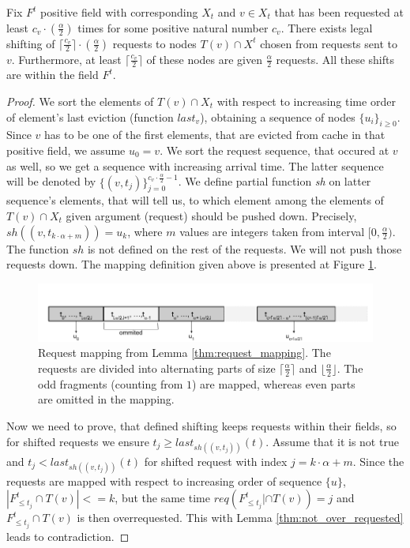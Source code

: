 \begin{lemma}
Fix $F^t$ positive field with corresponding $X_t$ and $v \in X_t$ that has 
been requested at least $c_v \cdot (\frac{\alpha}{2})$ times for some positive 
natural number $c_v$. There exists legal shifting of $\lceil \frac{c_v}{2} 
\rceil \cdot (\frac{\alpha}{2})$ requests to nodes 
$T(v) \cap X^t$ chosen from requests sent to $v$. Furthermore, at least $\lceil 
\frac{c_v}{2} \rceil$ of these nodes are given $\frac{\alpha}{2}$ requests. All 
these shifts are within the field $F^t$.
\label{thm:request_mapping}
\end{lemma}
\begin{proof}
We sort the elements of $T(v) \cap X_t$ with respect to increasing time order 
of element's last eviction (function $last_v$), obtaining a sequence of nodes 
$\{u_i\}_{i \geq 0}$. Since $v$ has to be one of the first elements, that are 
evicted from cache in that positive field, we assume $u_0 = v$. We sort the 
request sequence, that occured at $v$ as well, so we get a sequence with 
increasing arrival time. The latter sequence will be denoted by 
$\{(v, t_j)\}_{j=0}^{c_v \cdot \frac{\alpha}{2} - 1}$. We define partial 
function \textit{sh} on latter sequence's elements, that will tell us, to which 
element among the elements of  $T(v) \cap X_t$ given argument (request) should 
be pushed down. Precisely, $sh((v, t_{k \cdot \alpha + m})) = u_k$, where $m$ 
values are integers taken from interval $[0, \frac{\alpha}{2})$. The function 
$sh$ is not defined on the rest of the requests. We will not push those 
requests down. The mapping definition given above is presented at Figure 
\ref{fig:req_map}.
\begin{figure}
 \begin{center}
  \includegraphics[width=1.1\textwidth]{request_mapping.png}
 \end{center}
 \caption{Request mapping from Lemma \ref{thm:request_mapping}. The requests 
are divided into alternating parts of size $\lceil \frac{\alpha}{2} \rceil$ 
and $\lfloor \frac{\alpha}{2} \rfloor$. The odd fragments (counting from $1$) 
are mapped, whereas even parts are omitted in the mapping.}
 \label{fig:req_map}
\end{figure}

Now we need to prove, that defined shifting keeps requests within their fields, 
so for shifted requests we ensure $t_j \geq last_{sh((v, t_j))}(t)$. Assume 
that it is not true and 
$t_j < last_{sh((v, t_j))}(t)$ for shifted request with index 
$j = k \cdot \alpha + m$. Since the requests are mapped with respect to 
increasing order of sequence $\{u\}$, $|F^t_{\leq t_j} \cap T(v)| <= k$, but 
the same time $req(F^t_{\leq t_j}| \cap T(v)) = j$ and $F^t_{\leq t_j} \cap 
T(v)$ is then overrequested. This with Lemma \ref{thm:not_over_requested} leads 
to contradiction.
\end{proof}
